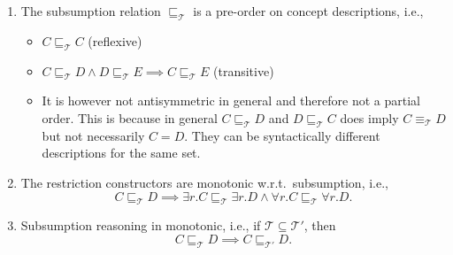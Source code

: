 \begin{lemma}
	\begin{enumerate}
		\item The subsumption relation $\sqsubseteq_{\mathcal{T}}$ is a pre-order on concept descriptions, i.e.,
			\begin{itemize}
				\item $C \sqsubseteq_{\mathcal{T}}C$ (reflexive)
				\item $C \sqsubseteq_{\mathcal{T}} D \land D \sqsubseteq_{\mathcal{T}} E \implies C \sqsubseteq_{\mathcal{T}} E$ (transitive)
				\item It is however not antisymmetric in general and therefore not a partial order.
					This is because in general $C \sqsubseteq_{\mathcal{T}} D$ and $D \sqsubseteq_{\mathcal{T}} C$
					does imply $C \equiv_{\mathcal{T}} D$ but not necessarily $C = D$.
					They can be syntactically different descriptions for the same set.
			\end{itemize}
		\item The restriction constructors are monotonic w.r.t.\ subsumption, i.e.,
			\[
			C \sqsubseteq_{\mathcal{T}} D \implies \exists r.C \sqsubseteq_{\mathcal{T}} \exists r.D \land \forall r.C \sqsubseteq_{\mathcal{T}} \forall r.D
			.\] 
		\item Subsumption reasoning in monotonic, i.e., if $\mathcal{T} \subseteq  \mathcal{T}'$, then
			\[
				C \sqsubseteq_{\mathcal{T}} D \implies C \sqsubseteq_{\mathcal{T}'} D
			.\] 
	\end{enumerate}
\end{lemma}
